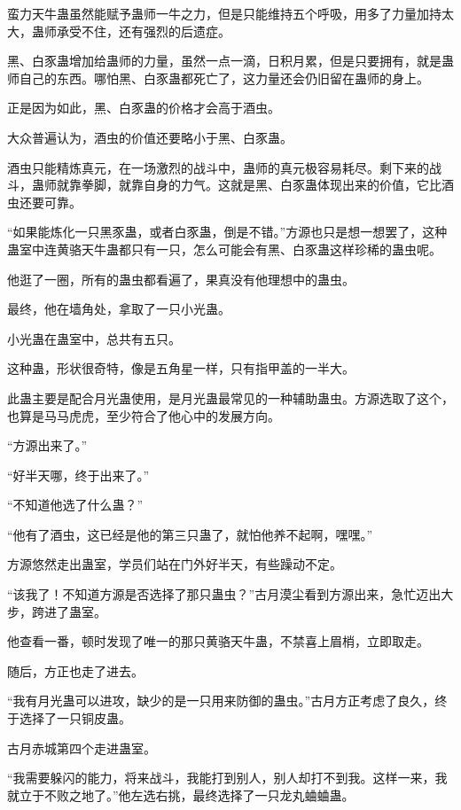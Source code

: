 \begin{this_body}
蛮力天牛蛊虽然能赋予蛊师一牛之力，但是只能维持五个呼吸，用多了力量加持太大，蛊师承受不住，还有强烈的后遗症。

黑、白豕蛊增加给蛊师的力量，虽然一点一滴，日积月累，但是只要拥有，就是蛊师自己的东西。哪怕黑、白豕蛊都死亡了，这力量还会仍旧留在蛊师的身上。

正是因为如此，黑、白豕蛊的价格才会高于酒虫。

大众普遍认为，酒虫的价值还要略小于黑、白豕蛊。

酒虫只能精炼真元，在一场激烈的战斗中，蛊师的真元极容易耗尽。剩下来的战斗，蛊师就靠拳脚，就靠自身的力气。这就是黑、白豕蛊体现出来的价值，它比酒虫还要可靠。

“如果能炼化一只黑豕蛊，或者白豕蛊，倒是不错。”方源也只是想一想罢了，这种蛊室中连黄骆天牛蛊都只有一只，怎么可能会有黑、白豕蛊这样珍稀的蛊虫呢。

他逛了一圈，所有的蛊虫都看遍了，果真没有他理想中的蛊虫。

最终，他在墙角处，拿取了一只小光蛊。

小光蛊在蛊室中，总共有五只。

这种蛊，形状很奇特，像是五角星一样，只有指甲盖的一半大。

此蛊主要是配合月光蛊使用，是月光蛊最常见的一种辅助蛊虫。方源选取了这个，也算是马马虎虎，至少符合了他心中的发展方向。

“方源出来了。”

“好半天哪，终于出来了。”

“不知道他选了什么蛊？”

“他有了酒虫，这已经是他的第三只蛊了，就怕他养不起啊，嘿嘿。”

方源悠然走出蛊室，学员们站在门外好半天，有些躁动不定。

“该我了！不知道方源是否选择了那只蛊虫？”古月漠尘看到方源出来，急忙迈出大步，跨进了蛊室。

他查看一番，顿时发现了唯一的那只黄骆天牛蛊，不禁喜上眉梢，立即取走。

随后，方正也走了进去。

“我有月光蛊可以进攻，缺少的是一只用来防御的蛊虫。”古月方正考虑了良久，终于选择了一只铜皮蛊。

古月赤城第四个走进蛊室。

“我需要躲闪的能力，将来战斗，我能打到别人，别人却打不到我。这样一来，我就立于不败之地了。”他左选右挑，最终选择了一只龙丸蛐蛐蛊。

\end{this_body}

